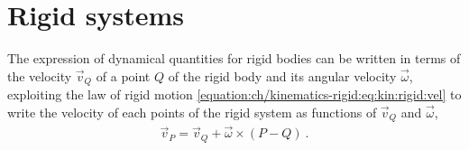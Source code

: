 \documentclass[letterpaper,10pt,english]{jupyterBook}
\begin{document}
\section{Rigid systems}
\label{\detokenize{ch/inertia:rigid-systems}}
\sphinxAtStartPar
The expression of dynamical quantities for rigid bodies can be written in terms of the velocity \(\vec{v}_Q\) of a point \(Q\) of the rigid body and its angular velocity \(\vec{\omega}\), exploiting the law of rigid motion \eqref{equation:ch/kinematics-rigid:eq:kin:rigid:vel} to write the velocity of each points of the rigid system as functions of \(\vec{v}_Q\) and \(\vec{\omega}\),
\begin{equation*}
\begin{split}\vec{v}_P = \vec{v}_Q + \vec{\omega} \times (P - Q) \ .\end{split}
\end{equation*}
\end{document}
